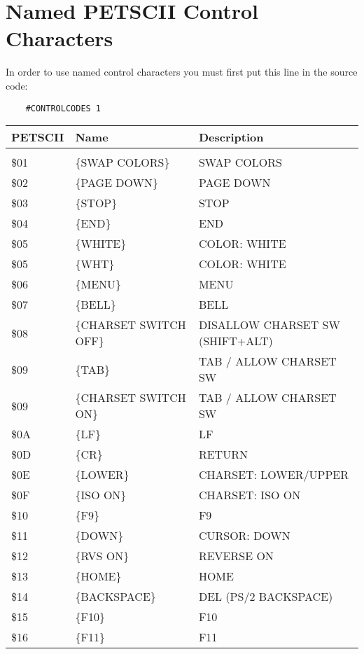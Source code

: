 \documentclass{article}
\begin{document}
\appendix
\newpage
\section{Named PETSCII Control Characters}
    
    In order to use named control characters you must first
    put this line in the source code:

    \begin{verbatim}
    #CONTROLCODES 1
    \end{verbatim}

    \begin{longtable}[l]{l l l}
        \textbf{PETSCII} & \textbf{Name} & \textbf{Description} \\
        \hline \\
        \$01 & \{SWAP COLORS\} & SWAP COLORS\\
        \$02 & \{PAGE DOWN\} & PAGE DOWN\\
        \$03 & \{STOP\} & STOP\\
        \$04 & \{END\} & END\\
        \$05 & \{WHITE\} & COLOR: WHITE\\
        \$05 & \{WHT\} & COLOR: WHITE\\
        \$06 & \{MENU\} & MENU\\
        \$07 & \{BELL\} & BELL\\
        \$08 & \{CHARSET SWITCH OFF\} & DISALLOW CHARSET SW (SHIFT+ALT)\\
        \$09 & \{TAB\} & TAB / ALLOW CHARSET SW\\
        \$09 & \{CHARSET SWITCH ON\} & TAB / ALLOW CHARSET SW\\
        \$0A & \{LF\} & LF\\
        \$0D & \{CR\} & RETURN\\
        \$0E & \{LOWER\} & CHARSET: LOWER/UPPER\\
        \$0F & \{ISO ON\} & CHARSET: ISO ON\\
        \$10 & \{F9\} & F9\\
        \$11 & \{DOWN\} & CURSOR: DOWN\\
        \$12 & \{RVS ON\} & REVERSE ON\\
        \$13 & \{HOME\} & HOME\\
        \$14 & \{BACKSPACE\} & DEL (PS/2 BACKSPACE)\\
        \$15 & \{F10\} & F10\\
        \$16 & \{F11\} & F11\\

\end{longtable}
\end{document}
